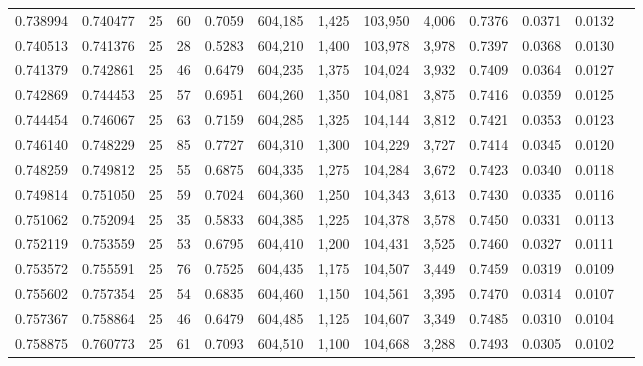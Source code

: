 \begin{tabular}{rrrrrrrrrrrrr}
0.738994 & 0.740477 &    25 &  60 &                                     0.7059 & 604,185 &   1,425 & 103,950 &   4,006 & 0.7376 & 0.0371 & 0.0132 \\
0.740513 & 0.741376 &    25 &  28 &                                     0.5283 & 604,210 &   1,400 & 103,978 &   3,978 & 0.7397 & 0.0368 & 0.0130 \\
0.741379 & 0.742861 &    25 &  46 &                                     0.6479 & 604,235 &   1,375 & 104,024 &   3,932 & 0.7409 & 0.0364 & 0.0127 \\
0.742869 & 0.744453 &    25 &  57 &                                     0.6951 & 604,260 &   1,350 & 104,081 &   3,875 & 0.7416 & 0.0359 & 0.0125 \\
0.744454 & 0.746067 &    25 &  63 &                                     0.7159 & 604,285 &   1,325 & 104,144 &   3,812 & 0.7421 & 0.0353 & 0.0123 \\
0.746140 & 0.748229 &    25 &  85 &                                     0.7727 & 604,310 &   1,300 & 104,229 &   3,727 & 0.7414 & 0.0345 & 0.0120 \\
0.748259 & 0.749812 &    25 &  55 &                                     0.6875 & 604,335 &   1,275 & 104,284 &   3,672 & 0.7423 & 0.0340 & 0.0118 \\
0.749814 & 0.751050 &    25 &  59 &                                     0.7024 & 604,360 &   1,250 & 104,343 &   3,613 & 0.7430 & 0.0335 & 0.0116 \\
0.751062 & 0.752094 &    25 &  35 &                                     0.5833 & 604,385 &   1,225 & 104,378 &   3,578 & 0.7450 & 0.0331 & 0.0113 \\
0.752119 & 0.753559 &    25 &  53 &                                     0.6795 & 604,410 &   1,200 & 104,431 &   3,525 & 0.7460 & 0.0327 & 0.0111 \\
0.753572 & 0.755591 &    25 &  76 &                                     0.7525 & 604,435 &   1,175 & 104,507 &   3,449 & 0.7459 & 0.0319 & 0.0109 \\
0.755602 & 0.757354 &    25 &  54 &                                     0.6835 & 604,460 &   1,150 & 104,561 &   3,395 & 0.7470 & 0.0314 & 0.0107 \\
0.757367 & 0.758864 &    25 &  46 &                                     0.6479 & 604,485 &   1,125 & 104,607 &   3,349 & 0.7485 & 0.0310 & 0.0104 \\
0.758875 & 0.760773 &    25 &  61 &                                     0.7093 & 604,510 &   1,100 & 104,668 &   3,288 & 0.7493 & 0.0305 & 0.0102 \\

\end{tabular}
